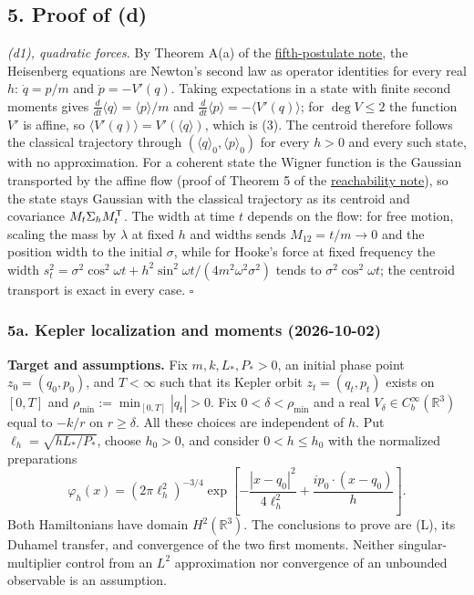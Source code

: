 \documentclass[11pt,a4paper]{article}
\begin{document}
\subsection{5. Proof of (d)}\label{proof-of-d}

\emph{(d1), quadratic forces.} By Theorem A(a) of the
\href{principia-fifth-postulate.md}{fifth-postulate note}, the
Heisenberg equations are Newton's second law as operator identities for
every real \(h\): \(\dot q=p/m\) and \(\dot p=-V'(q)\). Taking
expectations in a state with finite second moments gives
\(\tfrac{d}{dt}\langle q\rangle=\langle p\rangle/m\) and
\(\tfrac{d}{dt}\langle p\rangle=-\langle V'(q)\rangle\); for
\(\deg V\le2\) the function \(V'\) is affine, so
\(\langle V'(q)\rangle=V'(\langle q\rangle)\), which is (3). The
centroid therefore follows the classical trajectory through
\((\langle q\rangle_0,
\langle p\rangle_0)\) for every \(h>0\) and every such state, with no
approximation. For a coherent state the Wigner function is the Gaussian
transported by the affine flow (proof of Theorem 5 of the
\href{zero-branch-reachability.md}{reachability note}), so the state
stays Gaussian with the classical trajectory as its centroid and
covariance \(M_t\Sigma_hM_t^{\sf T}\). The width at time \(t\) depends
on the flow: for free motion, scaling the mass by \(\lambda\) at fixed
\(h\) and widths sends \(M_{12}=t/m\to0\) and the position width to the
initial \(\sigma\), while for Hooke's force at fixed frequency the width
\(s_t^2=\sigma^2\cos^2\omega t+h^2\sin^2\omega t/(4m^2\omega^2\sigma^2)\)
tends to \(\sigma^2\cos^2\omega t\); the centroid transport is exact in
every case. \(\square\)

\subsubsection{5a. Kepler localization and moments
(2026-10-02)}\label{a.-kepler-localization-and-moments-2026-10-02}

\textbf{Target and assumptions.} Fix \(m,k,L_*,P_*>0\), an initial phase
point \(z_0=(q_0,p_0)\), and \(T<\infty\) such that its Kepler orbit
\(z_t=(q_t,p_t)\) exists on \([0,T]\) and
\(\rho_{\min}:=\min_{[0,T]}|q_t|>0\). Fix \(0<\delta<\rho_{\min}\) and a
real \(V_\delta\in C_b^\infty(\mathbb R^3)\) equal to \(-k/r\) on
\(r\ge\delta\). All these choices are independent of \(h\). Put
\(\ell_h=\sqrt{hL_*/P_*}\), choose \(h_0>0\), and consider
\(0<h\le h_0\) with the normalized preparations
\[\varphi_h(x)=(2\pi\ell_h^2)^{-3/4}
\exp\left[-\frac{|x-q_0|^2}{4\ell_h^2}
          +\frac{i p_0\cdot(x-q_0)}h\right].\] Both Hamiltonians have
domain \(H^2(\mathbb R^3)\). The conclusions to prove are (L), its
Duhamel transfer, and convergence of the two first moments. Neither
singular-multiplier control from an \(L^2\) approximation nor
convergence of an unbounded observable is an assumption.
\end{document}
